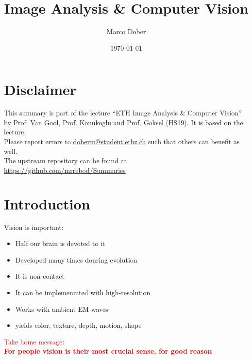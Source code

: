\documentclass[a4paper, fontsize=8pt, landscape, DIV=1]{scrartcl}
\title{Image Analysis \& Computer Vision}
\author{Marco Dober}
\date{\today}
\begin{document}
	\setcounter{secnumdepth}{3} %
	\begin{multicols*}{4}
		\section*{Disclaimer}
		This summary is part of the lecture ``ETH Image Analysis \& Computer Vision'' by Prof. Van Gool, Prof. Konukoglu and Prof. Goksel  (HS19). It is based on the lecture. \\[6pt]
		Please report errors to \href{mailto:doberm@student.ethz.ch}{doberm@student.ethz.ch} such that others can benefit as well.\\[6pt]	
		The upstream repository can be found at \href{https://github.com/mrrebod/Summaries}{https://github.com/mrrebod/Summaries}
		\vfill\null
		\pagebreak
		
		\maketitle 
		\thispagestyle{fancy}
		
		\section{Introduction}
		Vision is important:
		\begin{itemize}[noitemsep, label={$\blacktriangleright$}]
			\item Half our brain is devoted to it
			\item Developed many times douring evolution
			\item It is non-contact
			\item It can be implemenmted with high-resolution
			\item Works with ambient EM-waves
			\item yields color, texture, depth, motion, shape
		\end{itemize}
		\textcolor{red}{Take home message}:\\
		\textbf{\textcolor{red}{For people vision is their most crucial sense, for good reason}}

\end{multicols*}
\end{document}
